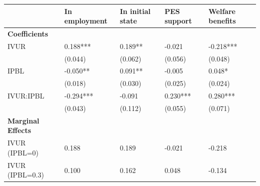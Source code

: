 \centering
\begin{tabular}{lllll}
\hline
& In employment & In initial state & PES support & Welfare benefits \\ 
\hline
\textbf{Coefficients} \\
IVUR & 0.188*** & 0.189** & -0.021 & -0.218*** \\
& (0.044) & (0.062) & (0.056) & (0.048) \\ 
IPBL & -0.050** & 0.091** & -0.005 & 0.048* \\
& (0.018) & (0.030) & (0.025) & (0.024) \\ 
IVUR:IPBL & -0.294*** & -0.091 & 0.230*** & 0.280*** \\
& (0.043) & (0.112) & (0.055) & (0.071) \\ 
\hline
\textbf{Marginal Effects} \\
IVUR (IPBL=0) & 0.188 & 0.189 & -0.021 & -0.218 \\
IVUR (IPBL=0.3) & 0.100 & 0.162 & 0.048 & -0.134 \\
\hline
\end{tabular}